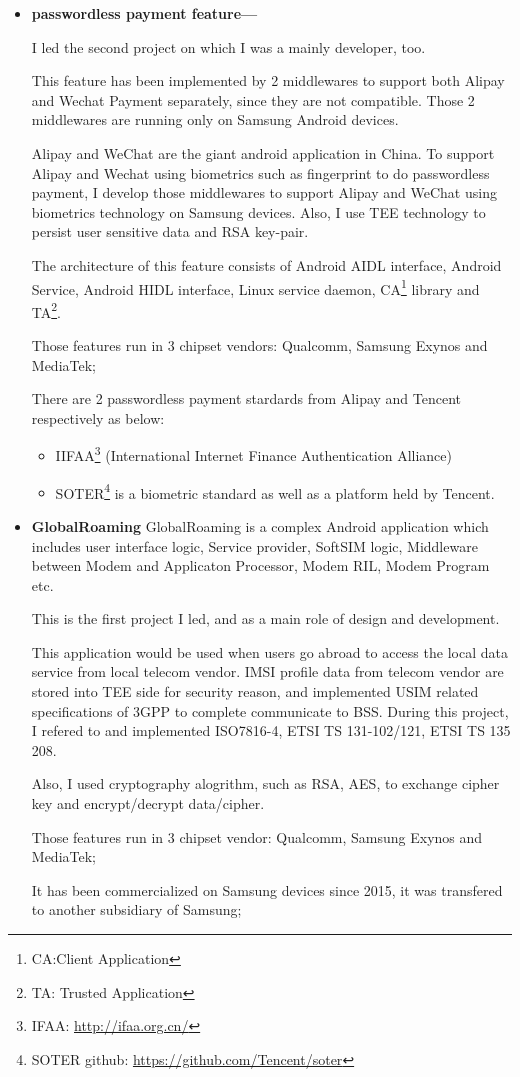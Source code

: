 \documentclass{article}
\begin{document}
\begin{itemize}
\item{\textbf{passwordless payment feature---}}

I led the second project on which I was a mainly developer, too.

This feature has been implemented by 2 middlewares to support both Alipay and Wechat Payment separately, since they are not compatible.
Those 2 middlewares are running only on Samsung Android devices.

Alipay and WeChat are the giant android application in China.
To support Alipay and Wechat using biometrics such as fingerprint to do passwordless payment,
I develop those middlewares to support Alipay and WeChat using biometrics technology on Samsung devices.
Also, I use TEE technology to persist user sensitive data and RSA key-pair.

The architecture of this feature consists of Android AIDL interface, Android Service, Android HIDL interface, Linux service daemon, CA\footnote{CA:Client Application} library
and TA\footnote{TA: Trusted Application}.

Those features run in 3 chipset vendors: Qualcomm, Samsung Exynos and MediaTek;

There are 2 passwordless payment stardards from Alipay and Tencent respectively as below:

\begin{itemize}
\item[1]{IIFAA}\footnote{IFAA: \url{http://ifaa.org.cn/}}
(International Internet Finance Authentication Alliance)

\item[2]{SOTER}\footnote{SOTER github: \url{https://github.com/Tencent/soter}}
is a biometric standard as well as a platform held by Tencent.
\end{itemize}

\item{\textbf{GlobalRoaming}}
GlobalRoaming is a complex Android application which includes user interface logic, Service provider, SoftSIM logic, Middleware between Modem and Applicaton Processor, Modem RIL, Modem Program etc.

This is the first project I led, and as a main role of design and development.

This application would be used when users go abroad to access the local data service from local telecom vendor.
IMSI profile data from telecom vendor are stored into TEE side for security reason, and implemented USIM related specifications of 3GPP to complete communicate to BSS.
During this project, I refered to and implemented ISO7816-4, ETSI TS 131-102/121, ETSI TS 135 208.

Also, I used cryptography alogrithm, such as RSA, AES, to exchange cipher key and encrypt/decrypt data/cipher.

Those features run in 3 chipset vendor: Qualcomm, Samsung Exynos and MediaTek;

It has been commercialized on Samsung devices since 2015, it was transfered to another subsidiary of Samsung;


\end{itemize}
\end{document}
